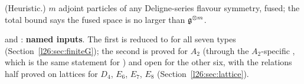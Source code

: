 \begin{physics}
(Heuristic.) $m$ adjoint particles of any Deligne-series flavour symmetry, fused; the total bound says the fused space is no larger than
$\mathfrak g^{\otimes m}$.
\end{physics}

\begin{status}
 and : \textbf{named inputs}. The first is reduced to
 for all seven types (Section~\ref{l26:sec:finiteG}); the second is proved for $A_2$ (through the
$A_2$-specific , which is the same statement for ) and open for the other six,
with the relations half proved on lattices for $D_4$, $E_6$, $E_7$, $E_8$ (Section~\ref{l26:sec:lattice}).
\end{status}

